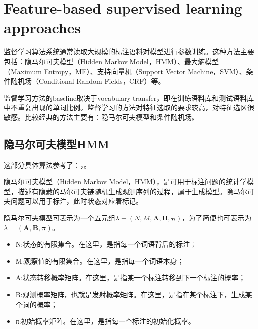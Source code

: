 \documentclass[a4paper,UTF8,no-math]{ctexart}
\begin{document}
	
	\section{Feature-based supervised learning approaches}
	
	监督学习算法系统通常读取大规模的标注语料对模型进行参数训练。这种方法主要包括：隐马尔可夫模型（Hidden Markov Model，HMM）、最大熵模型（Maximum Entropy，ME）、支持向量机（Support Vector Machine，SVM）、条件随机场（Conditional Random Fields，CRF）等。
	
	监督学习方法的baseline取决于vocabulary transfer，即在训练语料库和测试语料库中不重复出现的单词比例。监督学习的方法对特征选取的要求较高，对特征选区很敏感。比较经典的方法主要有：隐马尔可夫模型和条件随机场。
	
	\subsection{隐马尔可夫模型HMM}
	
	
	
	这部分具体算法参考了：\citep{李航2012统计学习方法}，\citep{宗成庆2013统计自然语言处理}。

	
	隐马尔可夫模型（Hidden Markov Model，HMM），是可用于标注问题的统计学模型，描述有隐藏的马尔可夫链随机生成观测序列的过程，属于生成模型。隐马尔可夫问题可以用于标注，此时状态对应着标记。
	
	
	
	隐马尔可夫模型可表示为一个五元组$\lambda=(N,M,\mathbf{A}, \mathbf{B}, \mathbf{\pi})$，为了简便也可表示为$\lambda=(\mathbf{A}, \mathbf{B}, \mathbf{\pi})$。
	
	
	
	\begin{itemize}
		\item N:状态的有限集合。在这里，是指每一个词语背后的标注；
		\item M:观察值的有限集合。在这里，是指每一个词语本身；
		\item A:状态转移概率矩阵。在这里，是指某一个标注转移到下一个标注的概率；
		\item B:观测概率矩阵，也就是发射概率矩阵。在这里，是指在某个标注下，生成某个词的概率；
		\item π:初始概率矩阵。在这里，是指每一个标注的初始化概率。
	\end{itemize}
	
\end{document}
